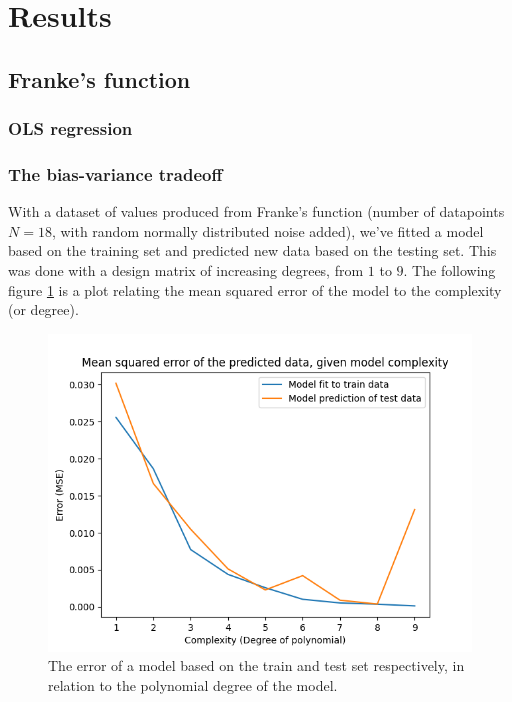 \documentclass[../main.tex]{subfiles}
\begin{document}
\section{Results}\label{sec:results}
\subsection{Franke's function}

\subsubsection{OLS regression}
\subsubsection{The bias-variance tradeoff}
With a dataset of values produced from Franke's function (number of datapoints $N=18$, with random normally distributed noise added), we've fitted a model based on the training set and predicted new data based on the testing set. This was done with a design matrix of increasing degrees, from $1$ to $9$. The following figure \ref{fig:result_complexity} is a plot relating the mean squared error of the model to the complexity (or degree).

\begin{figure}[h]
    \centering
    \includegraphics[width=\textwidth]{../assets/complexity.png}
    \caption{The error of a model based on the train and test set respectively, in relation to the polynomial degree of the model.}
    \label{fig:result_complexity}
\end{figure}
\end{document}

